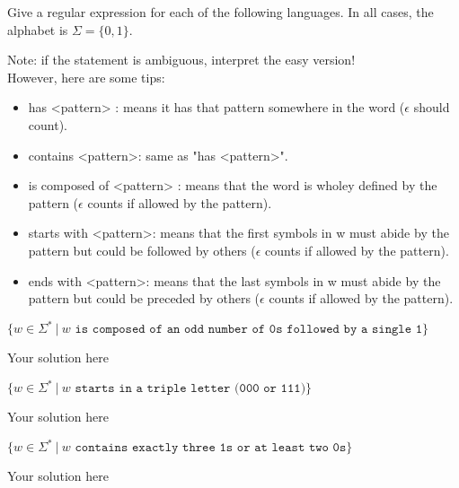 \documentclass[12pt]{article}
\newenvironment{exercise}[2][Exercise]{\begin{trivlist}
\item[\hskip \labelsep {\bfseries #1}\hskip \labelsep {\bfseries #2.}]}{\end{trivlist}}
\newenvironment{solution}[1][{\color{red} Solution:}]{\begin{trivlist}
\item[\hskip \labelsep {\bfseries #1}\hskip \labelsep {\bfseries}]}{\end{trivlist}}
\begin{document}
\begin{exercise}{2}

Give a regular expression for each of the following languages. In all cases, the alphabet is $\Sigma = \{0,1\}$.

Note: if the statement is ambiguous, interpret the easy version!\\
However, here are some tips: 
\begin{itemize}
	\item has <pattern> : means it has that pattern somewhere in the word ($\epsilon$ should count).
	\item contains <pattern>: same as "has <pattern>".	
	\item is composed of <pattern> : means that the word is wholey defined by the pattern ($\epsilon$ counts if allowed by the pattern).
	\item starts with <pattern>: means that the first symbols in w must abide by the pattern but could be followed by others ($\epsilon$ counts if allowed by the pattern).
	\item ends with <pattern>: means that the last symbols in w must abide by the pattern but could be preceded by others ($\epsilon$ counts if allowed by the pattern).
\end{itemize}

\begin{enumerate}[(a)]
	\item $\{ w \in \Sigma^* \ | \ w \texttt{ is composed of an odd number of 0s followed by a single 1}\}$
	\begin{solution}
		Your solution here
	\end{solution}
	
	\item $\{w \in \Sigma^* \ | \ w \texttt{ starts in a triple letter (000 or 111)}\}$
	\begin{solution}
		Your solution here
	\end{solution}
	
	\item $\{w \in \Sigma^* \ | \ w \texttt{ contains exactly three 1s or at least two 0s}\}$
	\begin{solution}
		Your solution here
	\end{solution}
	
\end{enumerate}

\end{exercise}
\end{document}
